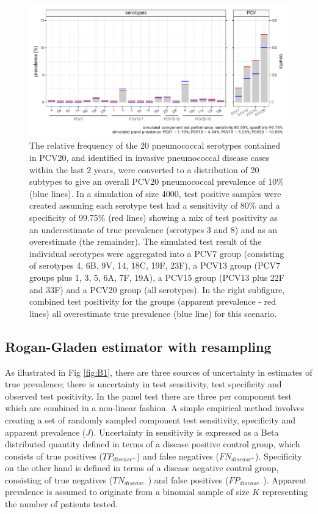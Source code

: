 \documentclass[a4paper, 12pt, twoside]{article}
\let\Oldsubsection\subsection
\renewcommand{\subsection}{\FloatBarrier\Oldsubsection}
\begin{document}
\begin{figure}[h!]
\centering
  \includegraphics{fig/simulation_setup_prev_10_v2}
  \caption{The relative frequency of the 20 pneumococcal serotypes contained in PCV20, and identified in invasive pneumococcal disease cases within the last 2 years, were converted to a distribution of 20 subtypes to give an overall PCV20 pneumococcal prevalence of 10\% (blue lines). In a simulation of size 4000, test positive samples were created assuming each serotype test had a sensitivity of 80\% and a specificity of 99.75\% (red lines) showing a mix of test positivity as an underestimate of true prevalence (serotypes 3 and 8) and as an overestimate (the remainder). The simulated test result of the individual serotypes were aggregated into a PCV7 group (consisting of serotypes 4, 6B, 9V, 14, 18C, 19F, 23F), a PCV13 group (PCV7 groups plus 1, 3, 5, 6A, 7F, 19A), a PCV15 group (PCV13 plus 22F and 33F) and a PCV20 group (all serotypes). In the right subfigure, combined test positivity for the groups (apparent prevalence - red lines) all overestimate true prevalence (blue line) for this scenario.}
\label{fig:B2}
\end{figure}

\subsection{Rogan-Gladen estimator with resampling}

As illustrated in Fig \ref{fig:B1}, there are three sources of uncertainty in estimates of true prevalence; there is uncertainty in test sensitivity, test specificity and observed test positivity. In the panel test there are three per component test which are combined in a non-linear fashion. A simple empirical method involves creating a set of randomly sampled component test sensitivity, specificity and apparent prevalence (\(J\)). Uncertainty in sensitivity is expressed as a Beta distributed quantity defined in terms of a disease positive control group, which consists of true positives (\(TP_{disease^+}\)) and false negatives (\(FN_{disease^+}\)). Specificity on the other hand is defined in terms of a disease negative control group, consisting of true negatives (\(TN_{disease^-}\)) and false positives (\(FP_{disease^-}\)). Apparent prevalence is assumed to originate from a binomial sample of size \(K\) representing the number of patients tested.
\end{document}
